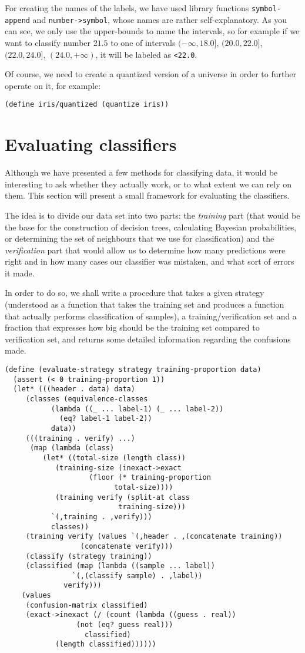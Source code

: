 For creating the names of the labels, we have used library
functions \texttt{symbol-append} and \texttt{number->symbol},
whose names are rather self-explanatory. As you can see,
we only use the upper-bounds to name the intervals, so for
example if we want to classify number $21.5$ to one of intervals
 $(-\infty, 18.0]$, $(20.0, 22.0]$, $(22.0, 24.0]$, $(24.0, +\infty)$,
it will be labeled as \texttt{<22.0}.

Of course, we need to create a quantized version of a universe
in order to further operate on it, for example:

\begin{Verbatim}[samepage=true]
(define iris/quantized (quantize iris))
\end{Verbatim}

\section{Evaluating classifiers}

Although we have presented a few methods for classifying data,
it would be interesting to ask whether they actually work, or
to what extent we can rely on them. This section will present
a small framework for evaluating the classifiers.

The idea is to divide our data set into two parts:
the \textit{training} part (that would be the base for the
construction of decision trees, calculating Bayesian probabilities,
or determining the set of neighbours that we use for classification)
and the \textit{verification} part that would allow us to
determine how many predictions were right and in how many cases
our classifier was mistaken, and what sort of errors it made.

In order to do so, we shall write a procedure that takes
a given strategy (understood as a function that takes the
training set and produces a function that actually performs
classification of samples), a training/verification set and
a fraction that expresses how big should be the training set
compared to verification set, and returns some detailed
information regarding the confusions made.

\begin{Verbatim}[samepage=true]
(define (evaluate-strategy strategy training-proportion data)
  (assert (< 0 training-proportion 1))
  (let* (((header . data) data)
	 (classes (equivalence-classes 
		   (lambda ((_ ... label-1) (_ ... label-2))
		     (eq? label-1 label-2))
		   data))
	 (((training . verify) ...)
	  (map (lambda (class)
		 (let* ((total-size (length class))
			(training-size (inexact->exact 
					(floor (* training-proportion
						  total-size))))
			(training verify (split-at class 
						   training-size)))
		   `(,training . ,verify)))
	       classes))
	 (training verify (values `(,header . ,(concatenate training))
				  (concatenate verify)))
	 (classify (strategy training))
	 (classified (map (lambda ((sample ... label))
			    `(,(classify sample) . ,label))
			  verify)))
    (values
     (confusion-matrix classified)
     (exact->inexact (/ (count (lambda ((guess . real))
				 (not (eq? guess real)))
			       classified)
			(length classified))))))
\end{Verbatim}

